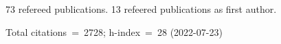 73 refereed publications. 13 refeered publications as first author.

Total citations~=~2728; h-index~=~28 (2022-07-23)